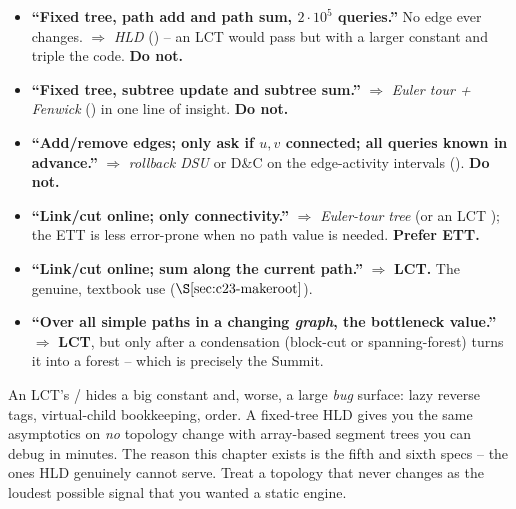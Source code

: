 \begin{itemize}[leftmargin=1.4em]
  \item \textbf{``Fixed tree, path add and path sum, \(2\cdot10^5\) queries.''} No
        edge ever changes. \(\Rightarrow\) \emph{HLD} () -- an LCT would
        pass but with a larger constant and triple the code. \textbf{Do not.}
  \item \textbf{``Fixed tree, subtree update and subtree sum.''} \(\Rightarrow\)
        \emph{Euler tour + Fenwick} () in one line of insight. \textbf{Do not.}
  \item \textbf{``Add/remove edges; only ask if \(u,v\) connected; all queries known
        in advance.''} \(\Rightarrow\) \emph{rollback DSU} or D\&C on the edge-activity
        intervals (). \textbf{Do not.}
  \item \textbf{``Link/cut online; only connectivity.''} \(\Rightarrow\) \emph{Euler-tour
        tree} (or an LCT ); the ETT is less error-prone when no path
        value is needed. \textbf{Prefer ETT.}
  \item \textbf{``Link/cut online; sum along the current path.''} \(\Rightarrow\) \textbf{LCT.}
        The genuine, textbook use (\(\secref{c23-makeroot}\)).
  \item \textbf{``Over all simple paths in a changing \emph{graph}, the bottleneck
        value.''} \(\Rightarrow\) \textbf{LCT}, but only after a condensation (block-cut
        or spanning-forest) turns it into a forest -- which is precisely the Summit.
\end{itemize}

\begin{insightbox}
An LCT's / hides a big constant and, worse, a large
\emph{bug} surface: lazy reverse tags, virtual-child bookkeeping, 
order. A fixed-tree HLD gives you the same asymptotics on \emph{no} topology change
with array-based segment trees you can debug in minutes. The reason this chapter
exists is the fifth and sixth specs -- the ones HLD genuinely cannot serve. Treat a
topology that never changes as the loudest possible signal that you wanted a static
engine.
\end{insightbox}

